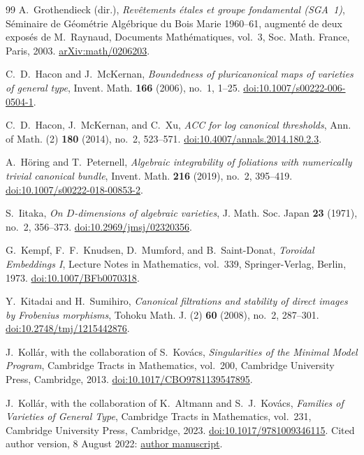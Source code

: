 \begin{thebibliography}{99}
A.~Grothendieck (dir.), \emph{Rev\^etements \'etales et groupe fondamental (SGA~1)},
S\'eminaire de G\'eom\'etrie Alg\'ebrique du Bois Marie 1960--61,
augment\'e de deux expos\'es de M.~Raynaud,
Documents Math\'ematiques, vol.~3, Soc. Math. France, Paris, 2003.
\href{https://arxiv.org/abs/math/0206203}{arXiv:math/0206203}.

C.~D.~Hacon and J.~McKernan,
\emph{Boundedness of pluricanonical maps of varieties of general type},
Invent. Math. \textbf{166} (2006), no.~1, 1--25.
\href{https://doi.org/10.1007/s00222-006-0504-1}{doi:10.1007/s00222-006-0504-1}.

C.~D.~Hacon, J.~McKernan, and C.~Xu,
\emph{ACC for log canonical thresholds},
Ann. of Math. (2) \textbf{180} (2014), no.~2, 523--571.
\href{https://doi.org/10.4007/annals.2014.180.2.3}{doi:10.4007/annals.2014.180.2.3}.

A.~H\"oring and T.~Peternell,
\emph{Algebraic integrability of foliations with numerically trivial canonical bundle},
Invent. Math. \textbf{216} (2019), no.~2, 395--419.
\href{https://doi.org/10.1007/s00222-018-00853-2}{doi:10.1007/s00222-018-00853-2}.

S.~Iitaka, \emph{On $D$-dimensions of algebraic varieties},
J. Math. Soc. Japan \textbf{23} (1971), no.~2, 356--373.
\href{https://doi.org/10.2969/jmsj/02320356}{doi:10.2969/jmsj/02320356}.

G.~Kempf, F.~F.~Knudsen, D.~Mumford, and B.~Saint-Donat,
\emph{Toroidal Embeddings I}, Lecture Notes in Mathematics, vol.~339,
Springer-Verlag, Berlin, 1973.
\href{https://doi.org/10.1007/BFb0070318}{doi:10.1007/BFb0070318}.

Y.~Kitadai and H.~Sumihiro,
\emph{Canonical filtrations and stability of direct images by Frobenius morphisms},
Tohoku Math. J. (2) \textbf{60} (2008), no.~2, 287--301.
\href{https://doi.org/10.2748/tmj/1215442876}{doi:10.2748/tmj/1215442876}.

J.~Koll\'ar, with the collaboration of S.~Kov\'acs,
\emph{Singularities of the Minimal Model Program},
Cambridge Tracts in Mathematics, vol.~200,
Cambridge University Press, Cambridge, 2013.
\href{https://doi.org/10.1017/CBO9781139547895}{doi:10.1017/CBO9781139547895}.

J.~Koll\'ar, with the collaboration of K.~Altmann and S.~J.~Kov\'acs,
\emph{Families of Varieties of General Type},
Cambridge Tracts in Mathematics, vol.~231,
Cambridge University Press, Cambridge, 2023.
\href{https://doi.org/10.1017/9781009346115}{doi:10.1017/9781009346115}.
Cited author version, 8 August 2022:
\href{https://web.math.princeton.edu/~kollar/FromMyHomePage/modbook-final.pdf}{author manuscript}.


\end{thebibliography}
